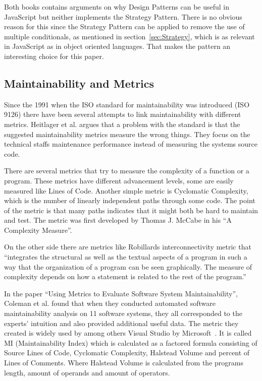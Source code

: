 \documentclass[conference, a4paper]{IEEEtran}
\begin{document}
Both books contains arguments on why Design Patterns can be useful in JavaScript but neither implements the Strategy Pattern. There is no obvious reason for this since the Strategy Pattern can be applied to remove the use of multiple conditionals, as mentioned in section~\ref{sec:Strategy}, which is as relevant in JavaScript as in object oriented languages. That makes the pattern an interesting choice for this paper.

\subsection{Maintainability and Metrics}
\label{sec:Maintainability}

Since the 1991 when the ISO standard for maintainability was introduced (ISO 9126) there have been several attempts to link maintainability with different metrics. Heitlager et al. argues that a problem with the standard is that the suggested maintainability metrics measure the wrong things. They focus on the technical staffs maintenance performance instead of measuring the systems source code.~\cite{bibitem:Maintainability}

There are several metrics that try to measure the complexity of a function or a program. These metrics have different advancement levels, some are easily measured like Lines of Code. Another simple metric is Cyclomatic Complexity, which is the number of linearly independent paths through some code. The point of the metric is that many paths indicates that it might both be hard to maintain and test. The metric was first developed by Thomas J. McCabe in his ``A Complexity Measure''.~\cite{bibitem:CC}

On the other side there are metrics like Robillards interconnectivity metric that ``integrates the structural as well as the textual aspects of a program in such a way that the organization of a program can be seen graphically. The measure of complexity depends on how a statement is related to the rest of the program.''~\cite{bibitem:Robillard}

In the paper ``Using Metrics to Evaluate Software System Maintainability'', Coleman et al. found that when they conducted automated software maintainability analysis on 11 software systems, they all corresponded to the experts' intuition and also provided additional useful data. The metric they created is widely used by among others Visual Studio by Microsoft~\cite{bibitem:MI}. It is called MI (Maintainability Index) which is calculated as a factored formula consisting of Source Lines of Code, Cyclomatic Complexity, Halstead Volume and percent of Lines of Comments. Where Halstead Volume is calculated from the programs length, amount of operands and amount of operators.~\cite{bibitem:MetricsToEvaluate}
\end{document}
